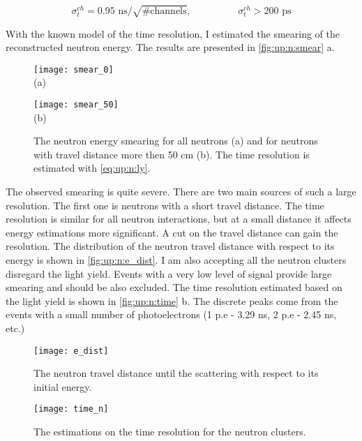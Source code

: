 \documentclass[main.tex]{subfiles}
\begin{document}
\begin{equation}
\label{eq:up:n:ch}
	\sigma^{ch}_t=0.95\text{ ns}/\sqrt{\text{\#channels}}, \hspace{2cm} \sigma^{ch}_t>200\text{ ps}
\end{equation}

With the known model of the time resolution, I estimated the smearing of the reconstructed neutron energy. The results are presented in \autoref{fig:up:n:smear} a.

\begin{figure}[!ht]
	\centering
	\begin{minipage}{0.49\linewidth}
		\centering
		\texttt{[image: smear\_0]} \\ (a)
	\end{minipage}
	\begin{minipage}{0.49\linewidth}
		\centering
		\texttt{[image: smear\_50]} \\ (b)
	\end{minipage}
	\caption{The neutron energy smearing for all neutrons (a) and for neutrons with travel distance more then 50 cm (b). The time resolution is estimated with \autoref{eq:up:n:ly}.}
	\label{fig:up:n:smear}
\end{figure}

The observed smearing is quite severe. There are two main sources of such a large resolution. The first one is neutrons with a short travel distance. The time resolution is similar for all neutron interactions, but at a small distance it affects energy estimations more significant. A cut on the travel distance can gain the resolution. The distribution of the neutron travel distance with respect to its energy is shown in \autoref{fig:up:n:e_dist}. I am also accepting all the neutron clusters disregard the light yield. Events with a very low level of signal provide large smearing and should be also excluded. The time resolution estimated based on the light yield is shown in \autoref{fig:up:n:time} b. The discrete peaks come from the events with a small number of photoelectrons (1 p.e - 3.29 ns, 2 p.e - 2.45 ns, etc.)

\begin{figure}[!ht]
	\centering
	\begin{minipage}{0.4\linewidth}
		\centering
		\texttt{[image: e\_dist]}
    \caption{The neutron travel distance until the scattering with respect to its initial energy.}
    \label{fig:up:n:e_dist}
	\end{minipage}
	\begin{minipage}{0.19\linewidth}
	\hspace{\linewidth}
	\end{minipage}
	\begin{minipage}{0.4\linewidth}
		\centering
		\texttt{[image: time\_n]}
    \caption{The estimations on the time resolution for the neutron clusters.}
    \label{fig:up:n:time}
	\end{minipage}
\end{figure}
\end{document}
